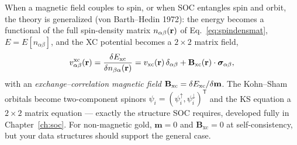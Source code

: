 When a magnetic field couples to spin, or when SOC entangles spin and orbit,
the theory is generalized (von Barth--Hedin 1972): the energy becomes a
functional of the full spin-density matrix
$n_{\alpha\beta}(\mathbf{r})$ of Eq.~\eqref{eq:spindensmat},
$E = E[n_{\alpha\beta}]$, and the XC potential becomes a $2\times2$ matrix
field,
\begin{equation}
v^{\mathrm{xc}}_{\alpha\beta}(\mathbf{r})
= \frac{\delta E_{\mathrm{xc}}}{\delta n_{\beta\alpha}(\mathbf{r})}
= v_{\mathrm{xc}}(\mathbf{r})\,\delta_{\alpha\beta}
+ \mathbf{B}_{\mathrm{xc}}(\mathbf{r})\cdot\bm\sigma_{\alpha\beta},
\label{eq:vxcmatrix}
\end{equation}
with an \emph{exchange--correlation magnetic field}
$\mathbf{B}_{\mathrm{xc}} = \delta E_{\mathrm{xc}} / \delta \mathbf{m}$. The Kohn--Sham
orbitals become two-component spinors
$\psi_i = (\psi_i^{\uparrow}, \psi_i^{\downarrow})^{\mathsf T}$ and the KS
equation a $2\times 2$ matrix equation --- exactly the structure SOC requires,
developed fully in Chapter~\ref{ch:soc}. For non-magnetic gold,
$\mathbf{m} = 0$ and $\mathbf{B}_{\mathrm{xc}} = 0$ at self-consistency, but
your data structures should support the general case.
